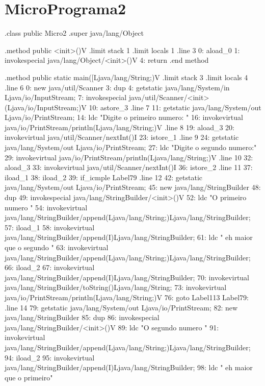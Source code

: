 \documentclass[12pt,a4paper,twoside]{report}
\begin{document}
\section{MicroPrograma2}
\begin{terminal}

.class public Micro2
.super java/lang/Object

.method public <init>()V
  .limit stack 1
  .limit locals 1
  .line 3
  0: aload_0
  1: invokespecial java/lang/Object/<init>()V
  4: return
.end method

.method public static main([Ljava/lang/String;)V
  .limit stack 3
  .limit locals 4
  .line 6
  0: new java/util/Scanner
  3: dup
  4: getstatic java/lang/System/in Ljava/io/InputStream;
  7: invokespecial java/util/Scanner/<init>(Ljava/io/InputStream;)V
  10: astore_3
  .line 7
  11: getstatic java/lang/System/out Ljava/io/PrintStream;
  14: ldc "Digite o primeiro numero: "
  16: invokevirtual java/io/PrintStream/println(Ljava/lang/String;)V
  .line 8
  19: aload_3
  20: invokevirtual java/util/Scanner/nextInt()I
  23: istore_1
  .line 9
  24: getstatic java/lang/System/out Ljava/io/PrintStream;
  27: ldc "Digite o segundo numero:"
  29: invokevirtual java/io/PrintStream/println(Ljava/lang/String;)V
  .line 10
  32: aload_3
  33: invokevirtual java/util/Scanner/nextInt()I
  36: istore_2
  .line 11
  37: iload_1
  38: iload_2
  39: if_icmple Label79
  .line 12
  42: getstatic java/lang/System/out Ljava/io/PrintStream;
  45: new java/lang/StringBuilder
  48: dup
  49: invokespecial java/lang/StringBuilder/<init>()V
  52: ldc "O primeiro numero "
  54: invokevirtual java/lang/StringBuilder/append(Ljava/lang/String;)Ljava/lang/StringBuilder;
  57: iload_1
  58: invokevirtual java/lang/StringBuilder/append(I)Ljava/lang/StringBuilder;
  61: ldc " eh maior que o segundo "
  63: invokevirtual java/lang/StringBuilder/append(Ljava/lang/String;)Ljava/lang/StringBuilder;
  66: iload_2
  67: invokevirtual java/lang/StringBuilder/append(I)Ljava/lang/StringBuilder;
  70: invokevirtual java/lang/StringBuilder/toString()Ljava/lang/String;
  73: invokevirtual java/io/PrintStream/println(Ljava/lang/String;)V
  76: goto Label113
Label79:
  .line 14
  79: getstatic java/lang/System/out Ljava/io/PrintStream;
  82: new java/lang/StringBuilder
  85: dup
  86: invokespecial java/lang/StringBuilder/<init>()V
  89: ldc "O segundo numero "
  91: invokevirtual java/lang/StringBuilder/append(Ljava/lang/String;)Ljava/lang/StringBuilder;
  94: iload_2
  95: invokevirtual java/lang/StringBuilder/append(I)Ljava/lang/StringBuilder;
  98: ldc " eh maior que o primeiro"

\end{terminal}
\end{document}
